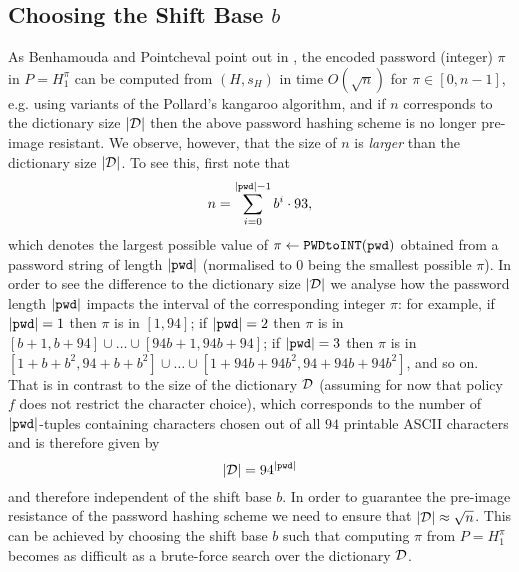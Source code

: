 \subsection{Choosing the Shift Base $b$}\label{rem:basischoice}
As Benhamouda and Pointcheval point out in \cite{BenhamoudaP13}, the encoded password (integer) $\pi$ in $P=H_1^\pi$ can be computed from $(H, s_H)$ in time $O(\sqrt{n})$ for $\pi \in [0,n-1]$, e.g. using variants of the Pollard's kangaroo algorithm, and if $n$ corresponds to the dictionary size $|\mathcal{D}|$ then the above password hashing scheme is no longer pre-image resistant. We observe, however, that
the size of $n$ is \emph{larger} than the dictionary size $|\mathcal{D}|$. To see this, first note that 
\[n=\sum_{i=0}^{|\mathtt{pwd}|-1}b^i\cdot 93,\] 
which denotes the largest possible value of $\pi \gets \texttt{PWDtoINT}(\mathtt{pwd})$ obtained from a password string of length $|\mathtt{pwd}|$ (normalised to $0$ being the smallest possible $\pi$). 
In order to see the difference to the dictionary size $|\mathcal{D}|$ we analyse how the password length $|\mathtt{pwd}|$ impacts the interval of the corresponding integer $\pi$: for example, if $|\mathtt{pwd}| = 1$ then $\pi$ is in $[1,94]$; if $|\mathtt{pwd}|=2$ then $\pi$ is in $[b+1,b+94]\cup \dots \cup[94b+1,94b+94]$; if $|\mathtt{pwd}|=3$ then $\pi$ is in  $[1+b+b^2,94+b+b^2]\cup\dots\cup[1+94b+94b^2,94+94b+94b^2]$, and so on. 
That is in contrast to the size of the dictionary $\mathcal{D}$ (assuming for now that policy $f$ does not restrict the character choice), which corresponds to the number of $|\mathtt{pwd}|$-tuples containing characters chosen out of all $94$ printable ASCII characters and is therefore given by 
\[|\mathcal{D}| = 94^{|\mathtt{pwd}|}\]
and therefore independent of the shift base $b$.
In order to guarantee the pre-image resistance of the password hashing scheme we need to ensure that $|\mathcal{D}| \approx \sqrt{n}$.
This can be achieved by choosing the shift base $b$ such that computing $\pi$ from $P=H_1^\pi$ becomes as difficult as a brute-force search over the dictionary $\mathcal{D}$. 
